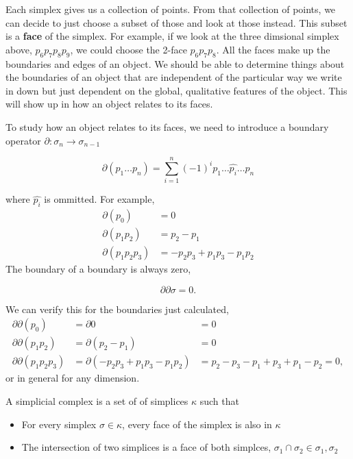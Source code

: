 Each simplex gives us a collection of points.  From that collection of points, we can decide to just choose a subset of those and look at those instead.  This subset is a \textbf{face} of the simplex.  For example, if we look at the three dimsional simplex above, $p_6 p_7 p_8 p_9$, we could choose the 2-face $p_6 p_7 p_8$.  All the faces make up the boundaries and edges of an object. We should be able to determine things about the boundaries of an object that are independent of the particular way we write in down but just dependent on the global, qualitative features of the object.  This will show up in how an object relates to its faces.

To study how an object relates to its faces, we need to introduce a boundary operator  $ \partial: \sigma_n \rightarrow \sigma_{n-1} $
\begin{tcolorbox}
\begin{equation}
  \partial \left(p_1 \dots p_n \right)
  = \sum_{i=1}^n (-1)^{i} p_1 \dots \hat{p_i} \dots p_n
\end{equation}
\end{tcolorbox}
where $\hat{p_i}$ is ommitted.  For example,
\begin{align}
  \partial(p_0) &= 0 \\
  \partial(p_1 p_2) & = p_2 - p_1 \\
  \partial(p_1 p_2 p_3) & = -p_2 p_3 + p_1 p_3 - p_1 p_2
\end{align}
The boundary of a boundary is always zero,
\begin{tcolorbox}
  \begin{equation}\label{eq:boundary_zero}
    \partial \partial \sigma =0.
  \end{equation}
\end{tcolorbox}
We can verify this for the boundaries just calculated,
\begin{align}
  \partial \partial (p_0 )& = \partial 0  &= 0 \\
  \partial \partial (p_1 p_2 )&= \partial (p_2 - p_1) &= 0 \\
  \partial \partial (p_1 p_2 p_3 )&= \partial (-p_2 p_3 + p_1 p_3 - p_1 p_2) &=
    p_2 - p_3 -p_1 + p_3  + p_1 -p_2 =0 ,
\end{align}
or in general for any dimension.





\begin{definition}
  A simplicial complex is a set of of simplices $\kappa$ such that
  \begin{itemize}
    \item For every simplex $\sigma \in \kappa$, every face of the simplex is also in $\kappa$
    \item The intersection of two simplices is a face of both simplces, $\sigma_1 \cap \sigma_2 \in \sigma_1 , \sigma_2$
  \end{itemize}
\end{definition}

